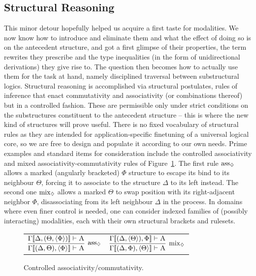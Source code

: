 \subsection{Structural Reasoning}
This minor detour hopefully helped us acquire a first taste for modalities.
We now know how to introduce and eliminate them and what the effect of doing so is on the antecedent structure, and got a first glimpse of their properties, the term rewrites they prescribe and the type inequalities (in the form of unidirectional derivations) they give rise to.
The question then becomes how to actually use them for the task at hand, namely disciplined traversal between substructural logics.
Structural reasoning is accomplished via structural postulates, rules of inference that enact commutativity and associativity (or combinations thereof) but in a controlled fashion.
These are permissible only under strict conditions on the substructures constituent to the antecedent structure -- this is where the new kind of structures will prove useful.
There is no fixed vocabulary of structural rules as they are intended for application-specific finetuning of a universal logical core, so we are free to design and populate it according to our own needs.
Prime examples and standard items for consideration include the controlled associativity and mixed associativity-commutativity rules of Figure~\ref{figure:modal_structural_rules}.
The first rule $\rulestyle{ass}_{\diamond}$ allows a marked (angularly bracketed) $\Phi$ structure to escape its bind to its neighbour $\Theta$, forcing it to associate to the structure $\Delta$ to its left instead.
The second one $\rulestyle{mix}_{\diamond}$ allows a marked $\Theta$ to swap position with its right-adjacent neighbor $\Phi$, disassociating from its left neighbour $\Delta$ in the process.
In domains where even finer control is needed, one can consider indexed families of (possibly interacting) modalities, each with their own structural brackets and rulesets.

\begin{figure}
	\centering
	\begin{tabularx}{0.75\textwidth}{@{}c@{\qquad}c@{}}	
	$
	\infer[\rulestyle{ass}_{\diamond}]{\Gamma\ctx{(\Delta, \Theta), \bracket{\Phi}} \vdash \prop{A}}{
		\Gamma\ctx{\Delta, (\Theta, \bracket{\Phi})} \vdash \prop{A}
	}
	$
	&
	$
	\infer[\rulestyle{mix}_{\diamond}]{\Gamma\ctx{(\Delta, \Phi), \bracket{\Theta}} \vdash \prop{A}}{
		\Gamma\ctx{(\Delta, \bracket{\Theta}), \Phi} \vdash \prop{A}
	}
	$
	\end{tabularx}
	\caption{Controlled associativity/commutativity.}	
	\label{figure:modal_structural_rules}
\end{figure} 


